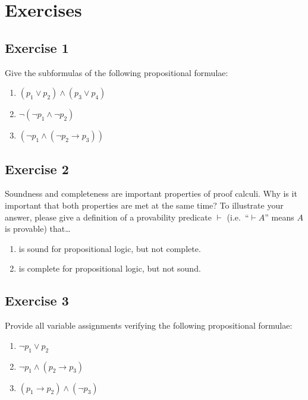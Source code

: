 \documentclass[11pt]{article}
\begin{document}
    \newpage
    \section{Exercises}
    \label{sec:exercises}

    \subsection*{Exercise 1}

    Give the subformulas of the following propositional formulae:

    \begin{enumerate}
        \item $(p_1 \vee p_2) \wedge (p_3 \vee p_4)$
        \item $\neg (\neg p_1 \wedge \neg p_2)$
        \item $(\neg p_1 \wedge (\neg p_2 \rightarrow p_3))$
    \end{enumerate}

    
    \subsection*{Exercise 2}

    Soundness and completeness are important properties of proof calculi.
    Why is it important that both properties are met at the same time?
    To illustrate your answer, please give a definition of a provability predicate $\vdash$ (i.e.\ ``$\vdash A$'' means $A$ is provable) that\ldots

    \begin{enumerate}
        \item is sound for propositional logic, but not complete.
        \item is complete for propositional logic, but not sound.
    \end{enumerate}

    
    \subsection*{Exercise 3}

    Provide all variable assignments verifying the following propositional formulae:

    \begin{enumerate}
        \item $\neg p_1 \vee p_2$
        \item $\neg p_1 \wedge (p_2 \rightarrow p_3)$
        \item $(p_1 \rightarrow p_2) \wedge (\neg p_3)$
    \end{enumerate}
\end{document}
